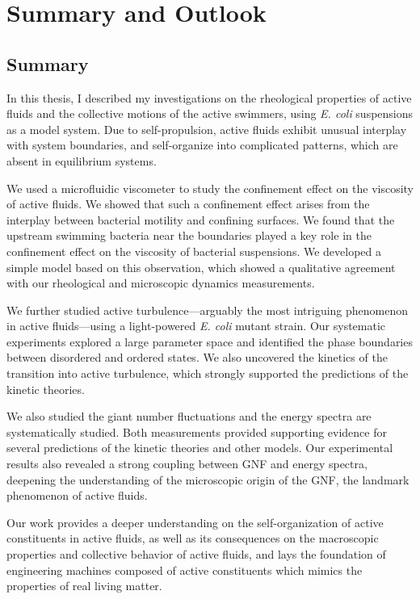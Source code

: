 \chapter{Summary and Outlook}
\label{summary-and-outlook}
\section{Summary}

In this thesis, I described my investigations on the rheological properties of active fluids and the collective motions of the active swimmers, using \textit{E. coli} suspensions as a model system. Due to self-propulsion, active fluids exhibit unusual interplay with system boundaries, and self-organize into complicated patterns, which are absent in equilibrium systems.

We used a microfluidic viscometer to study the confinement effect on the viscosity of active fluids. We showed that such a confinement effect arises from the interplay between bacterial motility and confining surfaces. We found that the upstream swimming bacteria near the boundaries played a key role in the confinement effect on the viscosity of bacterial suspensions. We developed a simple model based on this observation, which showed a qualitative agreement with our rheological and microscopic dynamics measurements.

We further studied active turbulence---arguably the most intriguing phenomenon in active fluids---using a light-powered \textit{E. coli} mutant strain. Our systematic experiments explored a large parameter space and identified the phase boundaries between disordered and ordered states. We also uncovered the kinetics of the transition into active turbulence, which strongly supported the predictions of the kinetic theories.

We also studied the giant number fluctuations and the energy spectra are systematically studied. Both measurements provided supporting evidence for several  predictions of the kinetic theories and other models. Our experimental results also revealed a strong coupling between GNF and energy spectra, deepening the understanding of the microscopic origin of the GNF, the landmark phenomenon of active fluids.


Our work provides a deeper understanding on the self-organization of active constituents in active fluids, as well as its consequences on the macroscopic properties and collective behavior of active fluids, and lays the foundation of engineering machines composed of active constituents which mimics the properties of real living matter.

